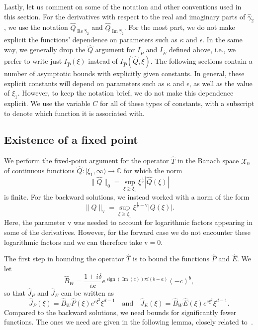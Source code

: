 \documentclass[11pt]{article}
\DeclareMathOperator{\real}{Re}
\DeclareMathOperator{\imag}{Im}
\DeclareMathOperator{\sign}{sign}
\newcommand{\normv}{\mathrm{v}}
\newcommand{\Space}{\mathcal{X}}
\begin{document}
Lastly, let us comment on some of the notation and other conventions
used in this section. For the derivatives with respect to the real and
imaginary parts of \(\hat{\gamma}_{2}\), we use the notation
\(\hat{Q}_{\real\hat{\gamma}_{2}}\) and
\(\hat{Q}_{\imag\hat{\gamma}_{2}}\). For the most part, we do not make
explicit the functions' dependence on parameters such as \(\kappa\)
and \(\epsilon\). In the same way, we generally drop the \(\hat{Q}\)
argument for \(I_{\hat{P}}\) and \(I_{\hat{E}}\) defined above, i.e.,
we prefer to write just \(I_{\hat{P}}(\xi)\) instead of
\(I_{\hat{P}}(\hat{Q}, \xi)\). The following sections contain a number
of asymptotic bounds with explicitly given constants. In general,
these explicit constants will depend on parameters such as \(\kappa\)
and \(\epsilon\), as well as the value of \(\xi_{1}\). However, to
keep the notation brief, we do not make this dependence explicit. We
use the variable \(C\) for all of these types of constants, with a
subscript to denote which function it is associated with.

\subsection{Existence of a fixed point}
\label{sec:fixed-point-hat}

We perform the fixed-point argument for the operator \(\hat{T}\) in
the Banach space \(\Space_{0}\) of continuous functions
\(\hat{Q} \colon [\xi_{1}, \infty) \to \mathbb{C}\) for which the norm
\begin{equation*}
  \|\hat{Q}\|_{0} = \sup_{\xi \geq \xi_{1}} \xi^{\frac{1}{\sigma}}|\hat{Q}(\xi)|
\end{equation*}
is finite. For the backward solutions, we instead worked with a norm of
the form
\begin{equation*}
  \|Q\|_{\normv} = \sup_{\xi \geq \xi_{1}} \xi^{\frac{1}{\sigma} - \normv}|Q(\xi)|.
\end{equation*}
Here, the parameter \(\normv\) was needed to account for logarithmic
factors appearing in some of the derivatives. However, for the forward
case we do not encounter these logarithmic factors and we can
therefore take \(\normv = 0\).

The first step in bounding the operator \(\hat{T}\) is to bound the
functions \(\hat{P}\) and \(\hat{E}\). We let
\begin{equation*}
  \hat{B}_{W} = \frac{1 + i\delta}{i\kappa}e^{\sign(\imag(c))\pi i(b - a)}(-c)^{b},
\end{equation*}
so that \(\hat{J}_{P}\) and \(\hat{J}_{E}\) can be written as
\begin{equation*}
  \hat{J}_{P}(\xi) = \hat{B}_{W}\hat{P}(\xi)e^{c\xi^{2}}\xi^{d - 1}
  \quad\text{and}\quad
  \hat{J}_{E}(\xi) = \hat{B}_{W}\hat{E}(\xi)e^{c\xi^{2}}\xi^{d - 1}.
\end{equation*}
Compared to the backward solutions, we need bounds for significantly
fewer functions. The ones we need are given in the following lemma,
closely related to~\cite[Lemma~7.3]{Dahne2024}.
\end{document}
